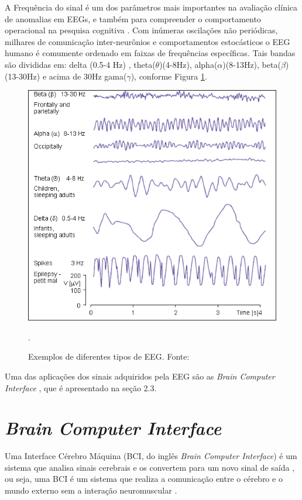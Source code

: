 A Frequência do sinal é um dos parâmetros mais importantes na avaliação clínica de anomalias em EEGs, e também para compreender o comportamento operacional na pesquisa cognitiva \cite{SIULYDissertacao}.
Com inúmeras oscilações não periódicas, milhares de comunicação inter-neurônios e comportamentos estocásticos o EEG humano é comumente ordenado  em faixas de frequências específicas. Tais bandas são divididas em: delta
 (0.5-4 Hz) , theta($\theta$)(4-8Hz), alpha($\alpha$)(8-13Hz), beta($\beta$)(13-30Hz) e acima de 30Hz gama($\gamma$), conforme Figura \ref{EEGcomun}.
 \newline

\begin{figure}[h]
	\centering
	\includegraphics[keepaspectratio=true,scale=0.75]{figuras/formas_EEG.png}
	\caption{Exemplos de diferentes tipos de EEG. Fonte: \cite{campisi2012eeg}}.
	\label{EEGcomun}
\end{figure}

Uma das aplicações dos sinais adquiridos pela EEG são as \textit{Brain Computer Interface} \cite{F.Lotte, SIULYDissertacao}, que é apresentado na seção 2.3.


\section{\textit{Brain Computer Interface}}

Uma Interface Cérebro Máquina (BCI, do inglês \textit{Brain Computer Interface}) é um sistema que analisa sinais cerebrais e os convertem para um novo sinal de saída \cite{BCIWolpaw}, ou seja, uma BCI é um sistema que realiza a comunicação entre o cérebro e o mundo externo sem a interação neuromuscular \cite{BCIWolpaw}.

